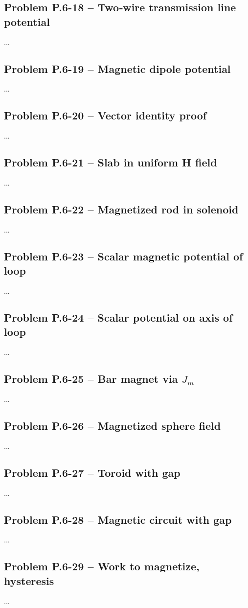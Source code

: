 \documentclass[12pt]{article}
\begin{document}
\subsection*{Problem P.6-18 – Two‑wire transmission line potential}
...
\bigskip
\subsection*{Problem P.6-19 – Magnetic dipole potential}
...
\bigskip
\subsection*{Problem P.6-20 – Vector identity proof}
...
\bigskip
\subsection*{Problem P.6-21 – Slab in uniform H field}
...
\bigskip
\subsection*{Problem P.6-22 – Magnetized rod in solenoid}
...
\bigskip
\subsection*{Problem P.6-23 – Scalar magnetic potential of loop}
...
\bigskip
\subsection*{Problem P.6-24 – Scalar potential on axis of loop}
...
\bigskip
\subsection*{Problem P.6-25 – Bar magnet via $J_m$}
...
\bigskip
\subsection*{Problem P.6-26 – Magnetized sphere field}
...
\bigskip
\subsection*{Problem P.6-27 – Toroid with gap}
...
\bigskip
\subsection*{Problem P.6-28 – Magnetic circuit with gap}
...
\bigskip
\subsection*{Problem P.6-29 – Work to magnetize, hysteresis}
...
\bigskip
\end{document}
